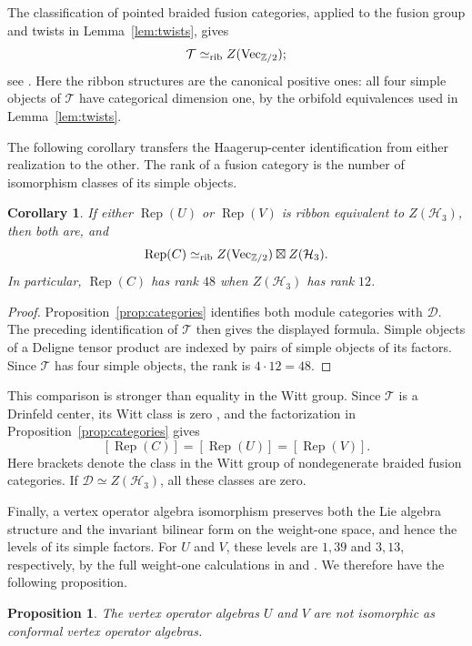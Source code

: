 \documentclass[11pt,reqno]{amsart}
\newtheorem{proposition}[theorem]{Proposition}
\newtheorem{corollary}[theorem]{Corollary}
\theoremstyle{definition}\newtheorem{definition}[theorem]{Definition}
\theoremstyle{remark}\newtheorem{remark}[theorem]{Remark}
\newcommand{\Rep}{\operatorname{Rep}}
\newcommand{\Tc}{\mathcal T}\newcommand{\D}{\mathcal D}
\numberwithin{equation}{section}
\begin{document}
The classification of pointed braided fusion categories, applied to the fusion group and twists in Lemma~\ref{lem:twists}, gives
\[
 \Tc\simeq_{\rm rib}Z(\mathrm{Vec}_{\Z/2});
\]
see \cite[Theorem 8.4.12]{EGNO}. Here the ribbon structures are the canonical positive ones: all four simple objects of $\Tc$ have categorical dimension one, by the orbifold equivalences used in Lemma~\ref{lem:twists}.

The following corollary transfers the Haagerup-center identification from either realization to the other. The rank of a fusion category is the number of isomorphism classes of its simple objects.

\begin{corollary}
If either $\Rep(U)$ or $\Rep(V)$ is ribbon equivalent to $Z(\mathcal H_3)$, then both are, and
\[
 \Rep(C)\simeq_{\rm rib}
 Z(\mathrm{Vec}_{\Z/2})\boxtimes Z(\mathcal H_3).
\]
In particular, $\Rep(C)$ has rank $48$ when $Z(\mathcal H_3)$ has rank $12$.
\end{corollary}
\begin{proof}
Proposition~\ref{prop:categories} identifies both module categories with $\D$. The preceding identification of $\Tc$ then gives the displayed formula. Simple objects of a Deligne tensor product are indexed by pairs of simple objects of its factors. Since $\Tc$ has four simple objects, the rank is $4\cdot12=48$.
\end{proof}

This comparison is stronger than equality in the Witt group. Since $\Tc$ is a Drinfeld center, its Witt class is zero \cite[Section 5.1]{DMNO}, and the factorization in Proposition~\ref{prop:categories} gives
\[
 [\Rep(C)]=[\Rep(U)]=[\Rep(V)].
\]
Here brackets denote the class in the Witt group of nondegenerate braided fusion categories. If $\D\simeq Z(\mathcal H_3)$, all these classes are zero.

Finally, a vertex operator algebra isomorphism preserves both the Lie algebra structure and the invariant bilinear form on the weight-one space, and hence the levels of its simple factors. For $U$ and $V$, these levels are $1,39$ and $3,13$, respectively, by the full weight-one calculations in \cite[Section 3, (15)]{Huang} and \cite[Proposition 4.6]{Jiao}. We therefore have the following proposition.

\begin{proposition}\label{prop:distinct}
The vertex operator algebras $U$ and $V$ are not isomorphic as conformal vertex operator algebras.
\end{proposition}
\end{document}
